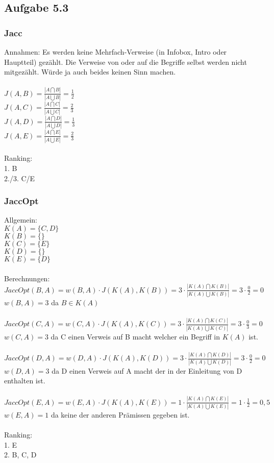 \subsection*{Aufgabe 5.3}
\subsubsection*{Jacc}
Annahmen: Es werden keine Mehrfach-Verweise (in Infobox, Intro oder Hauptteil) gezählt. Die Verweise von oder auf die Begriffe selbst werden nicht mitgezählt. Würde ja auch beides keinen Sinn machen.\\
\ \\
$J(A, B) = \frac{|A\bigcap B|}{|A\bigcup B|} = \frac{1}{2} $\\
$J(A, C) = \frac{|A\bigcap C|}{|A\bigcup C|} = \frac{2}{3} $\\
$J(A, D) = \frac{|A\bigcap D|}{|A\bigcup D|} = \frac{1}{3} $\\
$J(A, E) = \frac{|A\bigcap E|}{|A\bigcup E|} = \frac{2}{3} $\\
\ \\
Ranking:\\
1. B\\
2./3. C/E\\
\subsubsection*{JaccOpt}
Allgemein:\\
$K(A) = \{C,D\}$\\
$K(B) = \{\}$\\
$K(C) = \{E\}$\\
$K(D) = \{\}$\\
$K(E) = \{D\}$\\
\ \\
Berechnungen:\\
$JaccOpt(B,A) = w(B,A) \cdot J(K(A), K(B)) = 3 \cdot \frac{|K(A)\bigcap K(B)|}{|K(A)\bigcup K(B)|} = 3 \cdot \frac{0}{2} = 0 $ \\
$w(B,A) = 3$ da $B \in K(A)$\\
\ \\
$JaccOpt(C,A) = w(C,A) \cdot J(K(A), K(C)) = 3 \cdot \frac{|K(A)\bigcap K(C)|}{|K(A)\bigcup K(C)|} = 3 \cdot \frac{0}{3} = 0 $ \\
$w(C,A) = 3$ da C einen Verweis auf B macht welcher ein Begriff in $K(A)$ ist.\\
\ \\
$JaccOpt(D,A) = w(D,A) \cdot J(K(A), K(D)) = 3 \cdot \frac{|K(A)\bigcap K(D)|}{|K(A)\bigcup K(D)|} = 3 \cdot \frac{0}{2} = 0 $ \\
$w(D,A) = 3$ da D einen Verweis auf A macht der in der Einleitung von D enthalten ist.\\
\ \\
$JaccOpt(E,A) = w(E,A) \cdot J(K(A), K(E)) = 1 \cdot \frac{|K(A)\bigcap K(E)|}{|K(A)\bigcup K(E)|} = 1 \cdot \frac{1}{2} = 0,5 $ \\
$w(E,A) = 1$ da keine der anderen Prämissen gegeben ist.\\
\ \\
Ranking:\\
1. E\\
2. B, C, D\\
